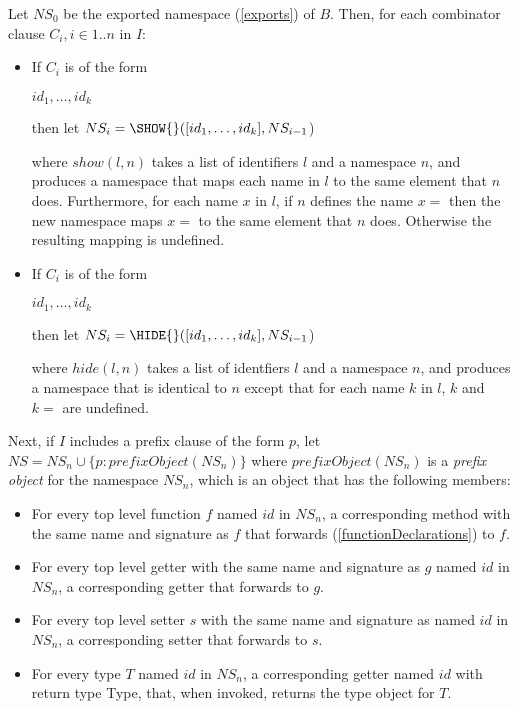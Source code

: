 \documentclass{article}
\newcommand{\code}[1]{{\sf #1}}
\begin{document}
\LMHash{}
Let $NS_0$ be the exported namespace (\ref{exports}) of $B$. Then, for each combinator clause $C_i, i \in 1..n$ in $I$:
\begin{itemize}
\item If $C_i$ is of the form 

\code{\SHOW{} $id_1, \ldots, id_k$} 

then let $NS_i = \SHOW{}([id_1, \ldots, id_k], NS_{i-1}$)

where $show(l,n)$ takes a list of identifiers $l$ and a namespace $n$, and produces a namespace that maps each name in $l$ to the same element that $n$ does. Furthermore, for each name $x$ in $l$, if $n$ defines the name  $x=$ then the new namespace maps $x=$ to the same element that $n$ does. Otherwise the resulting mapping is undefined.
  
\item If $C_i$ is of the form 

\code{\HIDE{} $id_1, \ldots, id_k$} 

then let $NS_i = \HIDE{}([id_1, \ldots, id_k], NS_{i-1}$) 

where $hide(l, n)$ takes a list of identfiers $l$ and a namespace $n$, and produces a namespace that is identical to $n$ except that for each name $k$ in $l$, $k$ and $k=$ are undefined. 
\end{itemize}
 
\LMHash{}
Next, if $I$ includes a prefix clause of the form \AS{} $p$, let $NS =  NS_n \cup \{p: prefixObject(NS_n)\}$ where $prefixObject(NS_n)$ is a {\em prefix object} for the namespace $NS_n$, which is an object that has the following members:

\begin{itemize}
\item  For every top level function $f$ named $id$ in $NS_n$, a corresponding method with the same name and signature as $f$ that forwards  (\ref{functionDeclarations}) to $f$.
\item For every top level getter  with the same name and signature as $g$ named $id$ in $NS_n$, a corresponding getter  that forwards to $g$.
\item For every top level setter $s$  with the same name and signature as named $id$ in $NS_n$, a corresponding setter  that forwards to  $s$.
\item For every type $T$ named $id$ in $NS_n$, a corresponding getter named $id$ with return type \code{Type}, that, when invoked, returns the type object for $T$.
\end{itemize}
\end{document}
